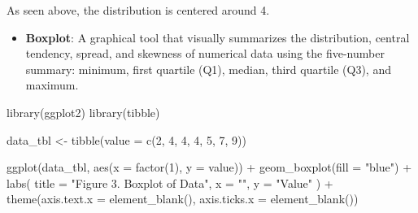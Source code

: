 \documentclass[
  man,
  floatsintext,
  longtable,
  nolmodern,
  notxfonts,
  notimes,
  colorlinks=true,linkcolor=blue,citecolor=blue,urlcolor=blue]{apa7}
\newenvironment{Shaded}{\begin{snugshade}}{\end{snugshade}}
\newcommand{\AttributeTok}[1]{\textcolor[rgb]{0.40,0.45,0.13}{#1}}
\newcommand{\DecValTok}[1]{\textcolor[rgb]{0.68,0.00,0.00}{#1}}
\newcommand{\FunctionTok}[1]{\textcolor[rgb]{0.28,0.35,0.67}{#1}}
\newcommand{\NormalTok}[1]{\textcolor[rgb]{0.00,0.23,0.31}{#1}}
\newcommand{\OtherTok}[1]{\textcolor[rgb]{0.00,0.23,0.31}{#1}}
\newcommand{\SpecialCharTok}[1]{\textcolor[rgb]{0.37,0.37,0.37}{#1}}
\newcommand{\StringTok}[1]{\textcolor[rgb]{0.13,0.47,0.30}{#1}}
\providecommand{\tightlist}{%
  \setlength{\itemsep}{0pt}\setlength{\parskip}{0pt}}
\begin{document}
As seen above, the distribution is centered around 4.

\begin{itemize}
\tightlist
\item
  \textbf{Boxplot}: A graphical tool that visually summarizes the
  distribution, central tendency, spread, and skewness of numerical data
  using the five-number summary: minimum, first quartile (Q1), median,
  third quartile (Q3), and maximum.
\end{itemize}

\begin{Shaded}
\begin{Highlighting}[]
\FunctionTok{library}\NormalTok{(ggplot2)}
\FunctionTok{library}\NormalTok{(tibble)}

\NormalTok{data\_tbl }\OtherTok{\textless{}{-}} \FunctionTok{tibble}\NormalTok{(}\AttributeTok{value =} \FunctionTok{c}\NormalTok{(}\DecValTok{2}\NormalTok{, }\DecValTok{4}\NormalTok{, }\DecValTok{4}\NormalTok{, }\DecValTok{4}\NormalTok{, }\DecValTok{5}\NormalTok{, }\DecValTok{7}\NormalTok{, }\DecValTok{9}\NormalTok{))}

\FunctionTok{ggplot}\NormalTok{(data\_tbl, }\FunctionTok{aes}\NormalTok{(}\AttributeTok{x =} \FunctionTok{factor}\NormalTok{(}\DecValTok{1}\NormalTok{), }\AttributeTok{y =}\NormalTok{ value)) }\SpecialCharTok{+}
  \FunctionTok{geom\_boxplot}\NormalTok{(}\AttributeTok{fill =} \StringTok{"blue"}\NormalTok{) }\SpecialCharTok{+}
  \FunctionTok{labs}\NormalTok{(}
    \AttributeTok{title =} \StringTok{"Figure 3. Boxplot of Data"}\NormalTok{,}
    \AttributeTok{x =} \StringTok{""}\NormalTok{,}
    \AttributeTok{y =} \StringTok{"Value"}
\NormalTok{  ) }\SpecialCharTok{+}
  \FunctionTok{theme}\NormalTok{(}\AttributeTok{axis.text.x =} \FunctionTok{element\_blank}\NormalTok{(),}
        \AttributeTok{axis.ticks.x =} \FunctionTok{element\_blank}\NormalTok{())}
\end{Highlighting}
\end{Shaded}
\end{document}
